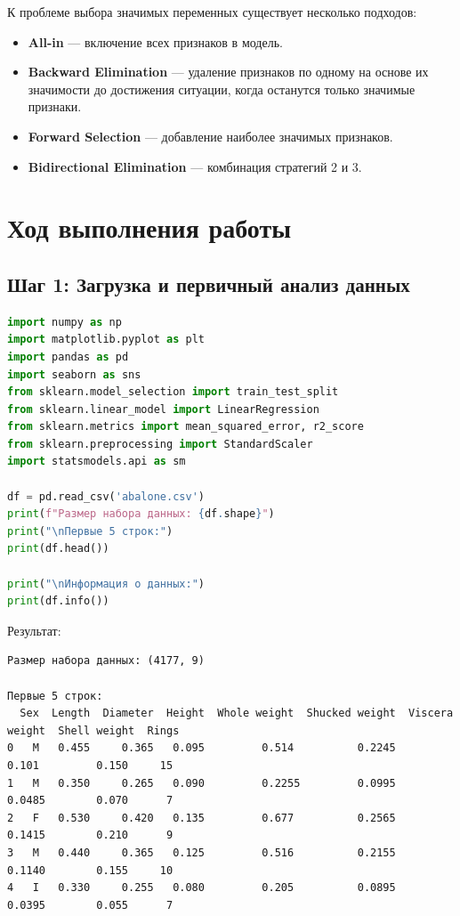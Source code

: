 К проблеме выбора значимых переменных существует несколько подходов:

\begin{itemize}
    \item \textbf{All-in} — включение всех признаков в модель.
    \item \textbf{Backward Elimination} — удаление признаков по одному на основе их значимости до достижения ситуации, когда останутся только значимые признаки.
    \item \textbf{Forward Selection} — добавление наиболее значимых признаков.
    \item \textbf{Bidirectional Elimination} — комбинация стратегий 2 и 3.
\end{itemize}

\section{Ход выполнения работы}

\subsection{Шаг 1: Загрузка и первичный анализ данных}

\begin{lstlisting}[language=Python, caption=Загрузка и анализ данных]
import numpy as np
import matplotlib.pyplot as plt
import pandas as pd
import seaborn as sns
from sklearn.model_selection import train_test_split
from sklearn.linear_model import LinearRegression
from sklearn.metrics import mean_squared_error, r2_score
from sklearn.preprocessing import StandardScaler
import statsmodels.api as sm

df = pd.read_csv('abalone.csv')
print(f"Размер набора данных: {df.shape}")
print("\nПервые 5 строк:")
print(df.head())

print("\nИнформация о данных:")
print(df.info())
\end{lstlisting}

Результат:

\begin{verbatim}
Размер набора данных: (4177, 9)

Первые 5 строк:
  Sex  Length  Diameter  Height  Whole weight  Shucked weight  Viscera weight  Shell weight  Rings
0   M   0.455     0.365   0.095         0.514          0.2245           0.101         0.150     15
1   M   0.350     0.265   0.090         0.2255         0.0995          0.0485        0.070      7
2   F   0.530     0.420   0.135         0.677          0.2565          0.1415        0.210      9
3   M   0.440     0.365   0.125         0.516          0.2155          0.1140        0.155     10
4   I   0.330     0.255   0.080         0.205          0.0895          0.0395        0.055      7
\end{verbatim}

